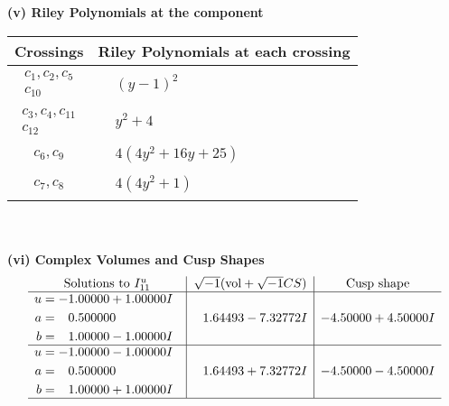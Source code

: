 \documentclass[1p]{elsarticle_modified}
\theoremstyle{definition}
\newcommand{\I}{\sqrt{-1}}
\begin{document}
\newpage\renewcommand{\arraystretch}{1}
\flushleft \textbf{(v) Riley Polynomials at the component}\newline \\
\begin{tabular}{m{50pt}|m{274pt}}
Crossings & \hspace{64pt}Riley Polynomials at each crossing \\
\hline $$\begin{aligned}c_{1},c_{2},c_{5}\\c_{10}\end{aligned}$$&$\begin{aligned}
&(y-1)^2
\end{aligned}$\\
\hline $$\begin{aligned}c_{3},c_{4},c_{11}\\c_{12}\end{aligned}$$&$\begin{aligned}
&y^2+4
\end{aligned}$\\
\hline $$\begin{aligned}c_{6},c_{9}\end{aligned}$$&$\begin{aligned}
&4(4 y^2+16 y+25)
\end{aligned}$\\
\hline $$\begin{aligned}c_{7},c_{8}\end{aligned}$$&$\begin{aligned}
&4(4 y^2+1)
\end{aligned}$\\
\hline
\end{tabular}\\~\\
\newpage\flushleft \textbf{(vi) Complex Volumes and Cusp Shapes}
$$\begin{array}{c|c|c}  
\text{Solutions to }I^u_{11}& \I (\text{vol} + \sqrt{-1}CS) & \text{Cusp shape}\\
 \hline 
\begin{aligned}
u &= -1.00000 + 1.00000 I \\
a &= \phantom{-}0.500000\phantom{ +0.000000I} \\
b &= \phantom{-}1.00000 - 1.00000 I\end{aligned}
 & \phantom{-}1.64493 - 7.32772 I & -4.50000 + 4.50000 I \\ \hline\begin{aligned}
u &= -1.00000 - 1.00000 I \\
a &= \phantom{-}0.500000\phantom{ +0.000000I} \\
b &= \phantom{-}1.00000 + 1.00000 I\end{aligned}
 & \phantom{-}1.64493 + 7.32772 I & -4.50000 - 4.50000 I\\
 \hline 
 \end{array}$$\newpage\newpage\renewcommand{\arraystretch}{1}
\end{document}
